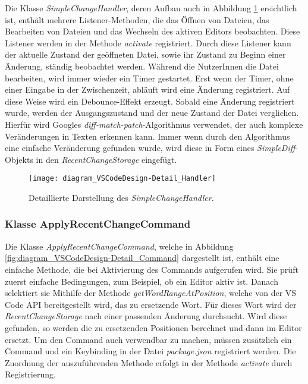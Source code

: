 Die Klasse \emph{SimpleChangeHandler}, 
deren Aufbau auch in Abbildung \ref{fig:diagram_VSCodeDesign-Detail_Handler} ersichtlich ist,
enthält mehrere Listener-Methoden,
die das Öffnen von Dateien, das Bearbeiten von Dateien und das
Wechseln des aktiven Editors beobachten. Diese Listener werden
in der Methode \emph{activate} registriert. Durch diese Listener
kann der aktuelle Zustand der geöffneten Datei, sowie ihr Zustand
zu Beginn einer Änderung, ständig beobachtet werden. Während
die NutzerInnen die Datei bearbeiten, wird immer wieder ein
Timer gestartet. Erst wenn der Timer, ohne einer Eingabe
in der Zwischenzeit, abläuft wird eine Änderung registriert. Auf diese 
Weise wird ein Debounce-Effekt erzeugt. Sobald eine Änderung
registriert wurde, werden der Ausgangszustand und der neue Zustand
der Datei verglichen. Hierfür wird Googles 
\emph{diff-match-patch}-Algorithmus \cite{DiffMatchPatchGithub}
verwendet, der auch komplexe Veränderungen in Texten erkennen kann. 
Immer wenn durch den Algorithmus eine einfache Veränderung gefunden
wurde, wird diese in Form eines \emph{SimpleDiff}-Objekts in
den \emph{RecentChangeStorage} eingefügt.

\begin{figure}
    \centering
    \texttt{[image: diagram\_VSCodeDesign-Detail\_Handler]}
    \caption{Detaillierte Darstellung des \emph{SimpleChangeHandler}.}
    \label{fig:diagram_VSCodeDesign-Detail_Handler}
\end{figure}

\subsubsection{Klasse ApplyRecentChangeCommand}

Die Klasse \emph{ApplyRecentChangeCommand}, 
welche in Abbildung \ref{fig:diagram_VSCodeDesign-Detail_Command} dargestellt ist,
enthält eine einfache Methode,
die bei Aktivierung des Commands aufgerufen wird. Sie prüft zuerst
einfache Bedingungen, zum Beispiel, ob ein Editor aktiv ist.
Danach selektiert sie Mithilfe der Methode \emph{getWordRangeAtPosition},
welche von der VS Code API bereitgestellt wird, das zu ersetzende Wort.
Für dieses Wort wird der \emph{RecentChangeStorage} nach einer passenden
Änderung durchsucht. Wird diese gefunden, so werden die zu ersetzenden
Positionen berechnet und dann im Editor ersetzt. Um den Command auch 
verwendbar zu machen, müssen zusätzlich ein Command und ein Keybinding
in der Datei \emph{package.json} registriert werden. Die Zuordnung
der auszuführenden Methode erfolgt in der Methode \emph{activate}
durch Registrierung.

